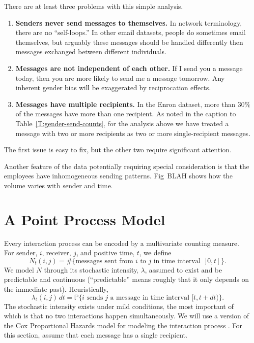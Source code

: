 \documentclass[aoas,preprint]{imsart}
\begin{document}
There are at least three problems with this simple analysis.
\begin{enumerate}
    \item \textbf{Senders never send messages to themselves.} In network
    terminology, there are no ``self-loops.'' In other email datasets, people
    do sometimes email themselves, but arguably these messages should be
    handled differently then messages exchanged between different individuals.
    
    \item \textbf{Messages are not independent of each other.} If I send
    you a message today, then you are more likely to send me a message
    tomorrow.  Any inherent gender bias will be exaggerated by
    reciprocation effects.
    
    \item \textbf{Messages have multiple recipients.} In the Enron dataset,
    more than 30\% of the messages have more than one recipient.  As noted in
    the caption to Table~\ref{T:gender-send-counts}, for the analysis above
    we have treated a message with two or more recipients as two or more
    single-recipient messages.
\end{enumerate}
The first issue is easy to fix, but the other two require significant
attention.

Another feature of the data potentially requiring special consideration is
that the employees have inhomogeneous sending patterns.  Fig~BLAH shows how
the volume varies with sender and time.

\section{A Point Process Model}\label{S:point-process-model}

Every interaction process can be encoded by a multivariate counting measure.
For sender, $i$, receiver, $j$, and positive time, $t$, we define
\[
    N_t(i,j)
        =
        \#\{\text{messages sent from $i$ to $j$ in time interval $[0,t]$}\}.
\]
We model $N$ through its stochastic intensity, $\lambda$, assumed to
exist and be predictable and continuous (``predictable'' means roughly that
it only depends on the immediate past).  Heuristically,
\[
    \lambda_t(i,j) \, dt
        =
        \mathbb{P}\{
            \text{$i$ sends $j$ a message in time interval $[t,t+dt)$}
        \}.
\]
The stochastic intensity exists
under mild conditions, the most important of which is that no two interactions
happen simultaneously.
We will use a version of the Cox Proportional Hazards model for modeling
the interaction process \cite{cox1972regression}.
For this section, assume that each message has a single recipient.
\end{document}
